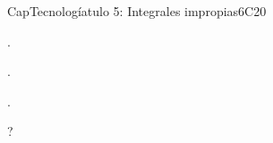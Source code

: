 \begin{syllabus}
\begin{unit}{CapTecnologíatulo 5: Integrales impropias}{}{}{6}{C20}
   \begin{learningoutcomes}
      \item .
      \item .
      \item .
   \end{learningoutcomes}   
\end{unit}



\begin{coursebibliography}
\end{coursebibliography}

?

\end{syllabus}
